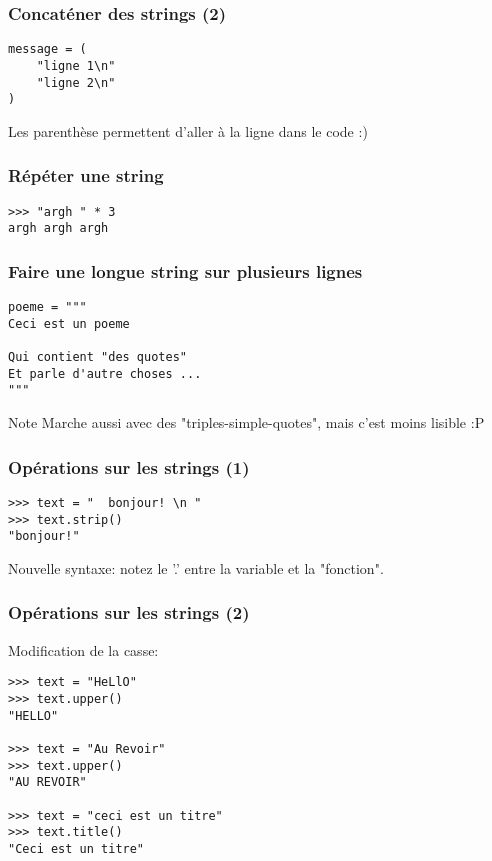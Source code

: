 \documentclass{beamer}
\begin{document}
\begin{frame}[fragile]
  \frametitle{Concaténer des strings (2)}
\begin{lstlisting}
message = (
    "ligne 1\n"
    "ligne 2\n"
)
\end{lstlisting}

Les parenthèse permettent d'aller à la ligne dans le code :)

\end{frame}


\begin{frame}[fragile]
  \frametitle{Répéter une string}

\begin{lstlisting}
>>> "argh " * 3
argh argh argh
\end{lstlisting}

\end{frame}


\begin{frame}[fragile]
  \frametitle{Faire une longue string sur plusieurs lignes}

\begin{lstlisting}
poeme = """
Ceci est un poeme

Qui contient "des quotes"
Et parle d'autre choses ...
"""
\end{lstlisting}

\begin{block}{Note}
Marche aussi avec des "triples-simple-quotes", mais c'est moins lisible :P
\end{block}
\end{frame}


\begin{frame}[fragile]
  \frametitle{Opérations sur les strings (1)}

\begin{lstlisting}
>>> text = "  bonjour! \n "
>>> text.strip()
"bonjour!"
\end{lstlisting}
Nouvelle syntaxe: notez le '.' entre la variable et la "fonction".
\end{frame}

\begin{frame}[fragile]
  \frametitle{Opérations sur les strings (2)}

Modification de la casse:

\begin{lstlisting}
>>> text = "HeLlO"
>>> text.upper()
"HELLO"

>>> text = "Au Revoir"
>>> text.upper()
"AU REVOIR"

>>> text = "ceci est un titre"
>>> text.title()
"Ceci est un titre"
\end{lstlisting}

\end{frame}
\end{document}
